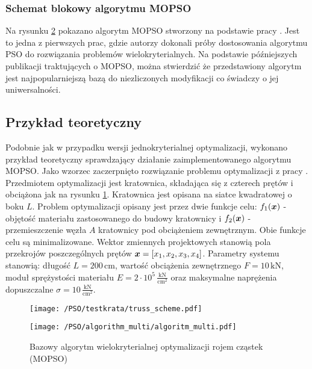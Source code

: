 \subsubsection{Schemat blokowy algorytmu MOPSO} \label{sect:MOPSO_algorithm}
Na rysunku \ref{fig: pso_multi_algorithm} pokazano algorytm MOPSO stworzony na podstawie pracy \parencite{CoelloCoello2002}. Jest to jedna z pierwszych prac, gdzie autorzy dokonali próby dostosowania algorytmu PSO do rozwiązania problemów wielokryterialnych. Na podstawie późniejszych publikacji traktujących o MOPSO, można stwierdzić że przedstawiony algorytm jest najpopularniejszą bazą do niezliczonych modyfikacji co świadczy o jej uniwersalności.



\subsection{Przykład teoretyczny}
Podobnie jak w przypadku wersji jednokryterialnej optymalizacji, wykonano przykład teoretyczny sprawdzający działanie zaimplementowanego algorytmu MOPSO. Jako wzorzec zaczerpnięto rozwiązanie problemu optymalizacji z pracy \parencite{Zavala2014}. Przedmiotem optymalizacji jest kratownica, składająca się z czterech prętów i obciążona jak na rysunku \ref{fig: pso_multi_testtruss}. Kratownica jest opisana na siatce kwadratowej o boku $L$. Problem optymalizacji opisany jest przez dwie funkcje celu: $f_1(\bm{x})$ - objętość materiału zastosowanego do budowy kratownicy i $f_2(\bm{x})$ - przemieszczenie węzła $A$ kratownicy pod obciążeniem zewnętrznym. Obie funkcje celu są minimalizowane. Wektor zmiennych projektowych stanowią pola przekrojów poszczególnych prętów $\bm{x}=[x_1,x_2,x_3,x_4]$. Parametry systemu stanowią: długość $L=200\,\text{cm}$, wartość obciążenia zewnętrznego $F=10\,\text{kN}$, moduł sprężystości materiału $E=2\cdot10^5\,\frac{\text{kN}}{\text{cm}^2}$ oraz maksymalne naprężenia dopuszczalne $\sigma=10\,\frac{\text{kN}}{\text{cm}^2}$.
\begin{figure}[hbt!]
	\centering
	\texttt{[image: /PSO/testkrata/truss\_scheme.pdf]} 
	\captionsetup{justification=centering}
	\caption{}
	\label{fig: pso_multi_testtruss} 
\end{figure}


\begin{figure}[p]
	\centering
	\texttt{[image: /PSO/algorithm\_multi/algoritm\_multi.pdf]}
	\captionsetup{justification=centering}
	\caption{Bazowy algorytm wielokryterialnej optymalizacji rojem cząstek (MOPSO)}
	\label{fig: pso_multi_algorithm}
\end{figure}

